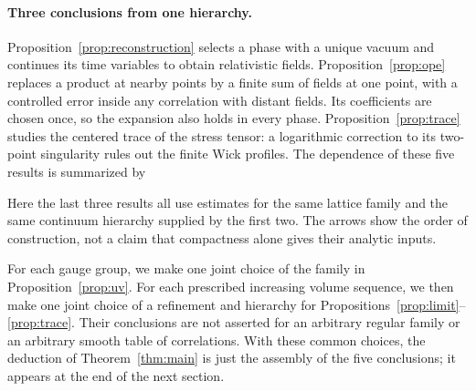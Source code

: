 \paragraph{Three conclusions from one hierarchy.}
Proposition~\ref{prop:reconstruction} selects a phase with a unique vacuum and continues its time variables to obtain relativistic fields.
Proposition~\ref{prop:ope} replaces a product at nearby points by a finite sum of fields at one point, with a controlled error inside any correlation with distant fields.
Its coefficients are chosen once, so the expansion also holds in every phase.
Proposition~\ref{prop:trace} studies the centered trace of the stress tensor: a logarithmic correction to its two-point singularity rules out the finite Wick profiles.
The dependence of these five results is summarized by
\begin{center}
\end{center}
Here the last three results all use estimates for the same lattice family and the same continuum hierarchy supplied by the first two.
The arrows show the order of construction, not a claim that compactness alone gives their analytic inputs.

For each gauge group, we make one joint choice of the family in Proposition~\ref{prop:uv}.
For each prescribed increasing volume sequence, we then make one joint choice of a refinement and hierarchy for Propositions~\ref{prop:limit}--\ref{prop:trace}.
Their conclusions are not asserted for an arbitrary regular family or an arbitrary smooth table of correlations.
With these common choices, the deduction of Theorem~\ref{thm:main} is just the assembly of the five conclusions; it appears at the end of the next section.

